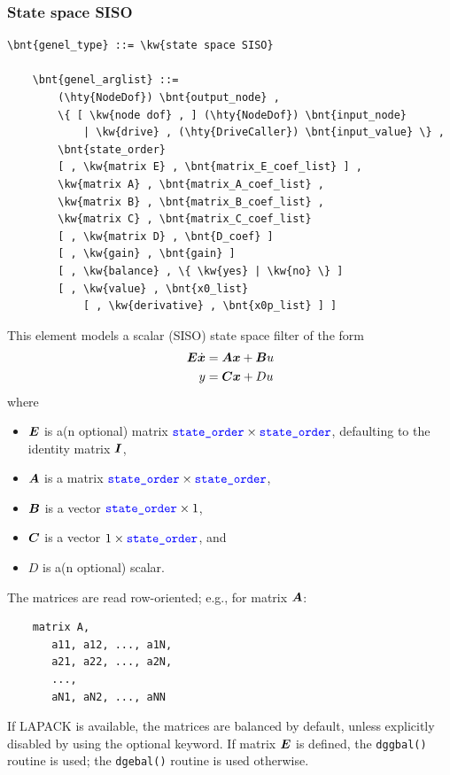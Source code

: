 \subsubsection{State space SISO}
\label{sec:EL:GENEL:STATE-SPACE-SISO}
\begin{Verbatim}[commandchars=\\\{\}]
    \bnt{genel_type} ::= \kw{state space SISO}

    \bnt{genel_arglist} ::=
        (\hty{NodeDof}) \bnt{output_node} ,
        \{ [ \kw{node dof} , ] (\hty{NodeDof}) \bnt{input_node}
            | \kw{drive} , (\hty{DriveCaller}) \bnt{input_value} \} ,
        \bnt{state_order}
        [ , \kw{matrix E} , \bnt{matrix_E_coef_list} ] ,
        \kw{matrix A} , \bnt{matrix_A_coef_list} ,
        \kw{matrix B} , \bnt{matrix_B_coef_list} ,
        \kw{matrix C} , \bnt{matrix_C_coef_list}
        [ , \kw{matrix D} , \bnt{D_coef} ]
        [ , \kw{gain} , \bnt{gain} ]
        [ , \kw{balance} , \{ \kw{yes} | \kw{no} \} ]
        [ , \kw{value} , \bnt{x0_list}
            [ , \kw{derivative} , \bnt{x0p_list} ] ]
\end{Verbatim}
This element models a scalar (SISO) state space filter of the form
\begin{align*}
	\boldsymbol{E} \dot{\boldsymbol{x}} &= \boldsymbol{A} \boldsymbol{x} + \boldsymbol{B} u \\
	y &= \boldsymbol{C} \boldsymbol{x} + D u
\end{align*}
where
\begin{itemize}
\item $\boldsymbol{E}$ is a(n optional) matrix
	$\textcolor{blue}{\texttt{state\_order}} \times \textcolor{blue}{\texttt{state\_order}}$, defaulting to the identity matrix $\boldsymbol{I}$,
\item $\boldsymbol{A}$ is a matrix
	$\textcolor{blue}{\texttt{state\_order}} \times \textcolor{blue}{\texttt{state\_order}}$,
\item $\boldsymbol{B}$ is a vector
	$\textcolor{blue}{\texttt{state\_order}} \times 1$,
\item $\boldsymbol{C}$ is a vector
	$1 \times \textcolor{blue}{\texttt{state\_order}}$, and
\item $D$ is a(n optional) scalar.
\end{itemize}
The matrices are read row-oriented; e.g., for matrix $\boldsymbol{A}$:
\begin{verbatim}
    matrix A,
       a11, a12, ..., a1N,
       a21, a22, ..., a2N,
       ...,
       aN1, aN2, ..., aNN
\end{verbatim}

If LAPACK is available, the matrices are balanced by default,
unless explicitly disabled by using the  optional keyword.
If matrix $\boldsymbol{E}$ is defined, the \texttt{dggbal()} routine is used;
the \texttt{dgebal()} routine is used otherwise.

